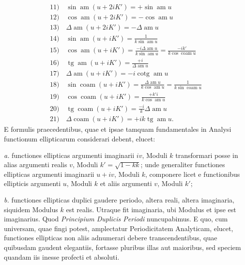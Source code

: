 \documentclass{article}
\begin{document}
\[
\begin{gathered}
\text{11)}\quad\sin\operatorname{am}(u+2iK')=+\sin\operatorname{am}u\\[1ex]
\text{12)}\quad\cos\operatorname{am}(u+2iK')=-\cos\operatorname{am}u\\[1ex]
\text{13)}\quad\Delta\operatorname{am}(u+2iK')=-\Delta\operatorname{am}u\\[1ex]
\text{14)}\quad\sin\operatorname{am}(u+iK')=\frac{1}{k\sin\operatorname{am}u}\\[1ex]
\text{15)}\quad\cos\operatorname{am}(u+iK')=\frac{-i\Delta\operatorname{am}u}{k\sin\operatorname{am}u}=\frac{-ik'}{k\cos\operatorname{coam}u}\\[1ex]
\text{16)}\quad\operatorname{tg}\operatorname{am}(u+iK')=\frac{+i}{\Delta\operatorname{am}u}\\[1ex]
\text{17)}\quad\Delta\operatorname{am}(u+iK')=-i\operatorname{cotg}\operatorname{am}u\\[1ex]
\text{18)}\quad\sin\operatorname{coam}(u+iK')=\frac{\Delta\operatorname{am}u}{k\cos\operatorname{am}u}=\frac{1}{k\sin\operatorname{coam}u}\\[1ex]
\text{19)}\quad\cos\operatorname{coam}(u+iK')=\frac{+k'i}{k\cos\operatorname{am}u}\\[1ex]
\text{20)}\quad\operatorname{tg}\operatorname{coam}(u+iK')=\frac{-i}{k}\Delta\operatorname{am}u\\[1ex]
\text{21)}\quad\Delta\operatorname{coam}(u+iK')=+ik\operatorname{tg}\operatorname{am}u.
\end{gathered}
\]
E formulis praecedentibus, quae et ipsae tamquam fundamentales in Analysi functionum ellipticarum considerari debent, elucet:

\emph{a.} functiones ellipticas argumenti imaginarii $iv$, Moduli $k$ transformari posse in alias argumenti realis $v$, Moduli $k'=\sqrt{1-kk}$; unde generaliter functiones ellipticas argumenti imaginarii $u+iv$, Moduli $k$, componere licet e functionibus ellipticis argumenti $u$, Moduli $k$ et aliis argumenti $v$, Moduli $k'$;

\emph{b.} functiones ellipticas duplici gaudere periodo, altera reali, altera imaginaria, siquidem Modulus $k$ est realis. Utraque fit imaginaria, ubi Modulus et ipse est imaginarius. Quod \emph{Principium Duplicis Periodi} nuncupabimus. E quo, cum universam, quae fingi potest, amplectatur Periodicitatem Analyticam, elucet, functiones ellipticas non aliis adnumerari debere transcendentibus, quae quibusdam gaudent elegantiis, fortasse pluribus illas aut maioribus, sed speciem quandam iis inesse profecti et absoluti.
\end{document}
